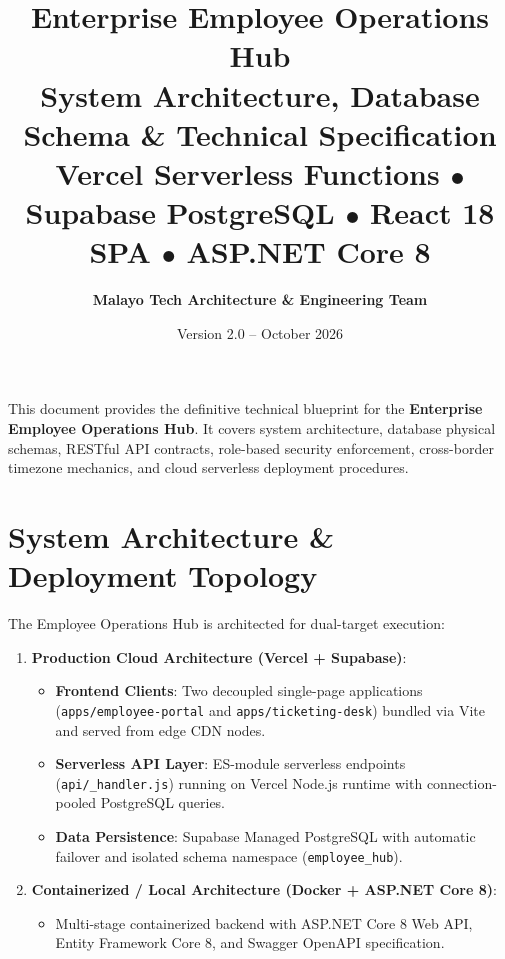 \documentclass[a4paper,11pt]{article}
\title{
  \vspace{-1.5cm}
  {\LARGE\textbf{\textcolor{branddark}{Enterprise Employee Operations Hub}}}\\[0.4cm]
  {\large\textbf{\textcolor{brandblue}{System Architecture, Database Schema \& Technical Specification}}}\\[0.3cm]
  {\small\textcolor{brandgray}{Vercel Serverless Functions $\bullet$ Supabase PostgreSQL $\bullet$ React 18 SPA $\bullet$ ASP.NET Core 8}}
}
\author{\textbf{Malayo Tech Architecture \& Engineering Team}}
\date{Version 2.0 -- October 2026}
\begin{document}
\maketitle
\thispagestyle{empty}

\vspace{-0.4cm}
\begin{center}
\begin{minipage}{0.96\textwidth}
\begin{infobox}
This document provides the definitive technical blueprint for the \textbf{Enterprise Employee Operations Hub}. It covers system architecture, database physical schemas, RESTful API contracts, role-based security enforcement, cross-border timezone mechanics, and cloud serverless deployment procedures.
\end{infobox}
\end{minipage}
\end{center}

\vspace{0.2cm}
\tableofcontents
\newpage

\section{System Architecture \& Deployment Topology}

The Employee Operations Hub is architected for dual-target execution:
\begin{enumerate}
    \item \textbf{Production Cloud Architecture (Vercel + Supabase)}:
    \begin{itemize}
        \item \textbf{Frontend Clients}: Two decoupled single-page applications (\texttt{apps/employee-portal} and \texttt{apps/ticketing-desk}) bundled via Vite and served from edge CDN nodes.
        \item \textbf{Serverless API Layer}: ES-module serverless endpoints (\texttt{api/\_handler.js}) running on Vercel Node.js runtime with connection-pooled PostgreSQL queries.
        \item \textbf{Data Persistence}: Supabase Managed PostgreSQL with automatic failover and isolated schema namespace (\texttt{employee\_hub}).
    \end{itemize}
    \item \textbf{Containerized / Local Architecture (Docker + ASP.NET Core 8)}:
    \begin{itemize}
        \item Multi-stage containerized backend with ASP.NET Core 8 Web API, Entity Framework Core 8, and Swagger OpenAPI specification.
    \end{itemize}
\end{enumerate}
\end{document}
